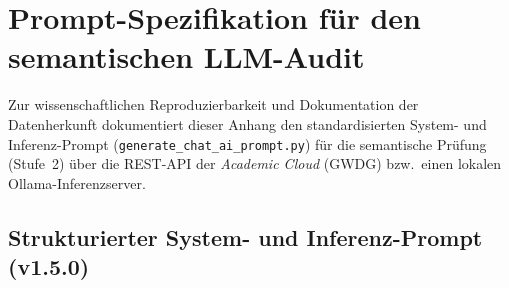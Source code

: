 \chapter{Prompt-Spezifikation für den semantischen LLM-Audit}
\label{app:prompt_extrakt}

Zur wissenschaftlichen Reproduzierbarkeit und Dokumentation der Datenherkunft dokumentiert dieser Anhang den standardisierten System- und Inferenz-Prompt (\texttt{generate\_\allowbreak chat\_\allowbreak ai\_\allowbreak prompt.py}) für die semantische Prüfung (Stufe~2) über die REST-API der \textit{Academic Cloud} (GWDG) bzw.\ einen lokalen Ollama-Inferenzserver.

\section*{Strukturierter System- und Inferenz-Prompt (v1.5.0)}

